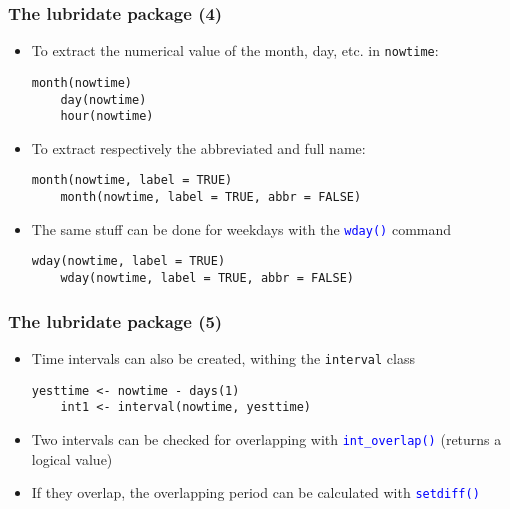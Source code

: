 \documentclass[10pt]{beamer}
\newcommand{\cc}[1]{\texttt{\textcolor{blue}{#1}}}
\theoremstyle{definition}
\begin{document}
\begin{frame}[fragile]
\frametitle{The \textbf{lubridate} package (4)}
\begin{itemize}
	\item To extract the numerical value of the month, day, etc. in \texttt{nowtime}:
	\begin{lstlisting}[style = rstyle, breaklines]
	month(nowtime)
	day(nowtime)
	hour(nowtime)
	\end{lstlisting}
	\item To extract respectively the abbreviated and full name:
	\begin{lstlisting}[style = rstyle, breaklines]
	month(nowtime, label = TRUE)
	month(nowtime, label = TRUE, abbr = FALSE)
	\end{lstlisting}
	\item The same stuff can be done for weekdays with the \cc{wday()} command
	\begin{lstlisting}[style = rstyle, breaklines]
	wday(nowtime, label = TRUE)
	wday(nowtime, label = TRUE, abbr = FALSE)
	\end{lstlisting}
\end{itemize}
\end{frame}

\begin{frame}[fragile]
\frametitle{The \textbf{lubridate} package (5)}
\begin{itemize}
	\item Time intervals can also be created, withing the \texttt{interval} class
	\begin{lstlisting}[style = rstyle, breaklines]
	yesttime <- nowtime - days(1)
	int1 <- interval(nowtime, yesttime)
	\end{lstlisting}
	\item Two intervals can be checked for overlapping with \cc{int\_overlap()} (returns a logical value)
	\item If they overlap, the overlapping period can be calculated with \cc{setdiff()}
\end{itemize}
\end{frame}
\end{document}
